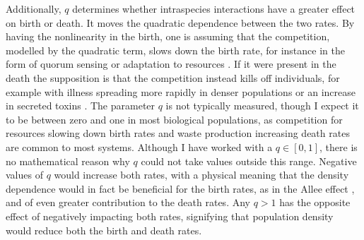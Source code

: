 Additionally, $q$ determines whether intraspecies interactions have a greater effect on birth or death. 
It moves the quadratic dependence between the two rates. 
By having the nonlinearity in the birth, one is assuming that the competition, modelled by the quadratic term, slows down the birth rate, for instance in the form of quorum sensing \cite{Nadell2008} or adaptation to resources \cite{Vulic2001}. 
If it were present in the death the supposition is that the competition instead kills off individuals, for example with illness spreading more rapidly in denser populations \cite{Greenhalgh1990} or an increase in secreted toxins \cite{VanMelderen2009,Rankin2012}.
The parameter $q$ is not typically measured, though I expect it to be between zero and one in most biological populations, as competition for resources slowing down birth rates and waste production increasing death rates are common to most systems. 
Although I have worked with a $q \in [0,1]$, there is no mathematical reason why $q$ could not take values outside this range. 
Negative values of $q$ would increase both rates, with a physical meaning that the density dependence would in fact be beneficial for the birth rates, as in the Allee effect \cite{Chesson2000,Assaf2016}, and of even greater contribution to the death rates. 
Any $q>1$ has the opposite effect of negatively impacting both rates, signifying that population density would reduce both the birth and death rates. %

